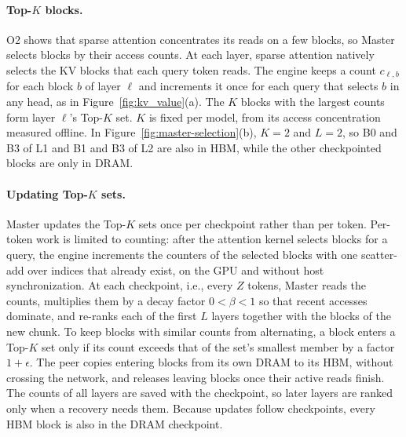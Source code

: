 \paragraph{Top-$K$ blocks.}
O2 shows that sparse attention concentrates its reads on a few blocks, so
Master selects blocks by their access counts. At each layer, sparse
attention natively selects the KV blocks that each query token reads. The
engine keeps a count $c_{\ell,b}$ for each block $b$ of layer $\ell$ and
increments it once for each query that selects $b$ in any head, as in
Figure~\ref{fig:kv_value}(a). The $K$ blocks with the largest counts form
layer $\ell$'s Top-$K$ set. $K$ is fixed per model, from its access
concentration measured offline. In Figure~\ref{fig:master-selection}(b),
$K=2$ and $L=2$, so B0 and B3 of L1 and B1 and B3 of L2 are also in HBM,
while the other checkpointed blocks are only in DRAM.

\paragraph{Updating Top-$K$ sets.}
Master updates the Top-$K$ sets once per checkpoint rather than per
token. Per-token work is limited to counting: after the attention kernel
selects blocks for a query, the engine increments the counters of the
selected blocks with one scatter-add over indices that already exist, on
the GPU and without host synchronization. At each checkpoint, i.e., every
$Z$ tokens, Master reads the counts, multiplies them by a decay factor
$0<\beta<1$ so that recent accesses dominate, and re-ranks each of the
first $L$ layers together with the blocks of the new chunk. To keep blocks
with similar counts from alternating, a block enters a Top-$K$ set only if
its count exceeds that of the set's smallest member by a factor $1+\epsilon$.
The peer copies entering blocks from its own DRAM to its HBM, without
crossing the network, and releases leaving blocks once their active reads
finish. The counts of all layers are saved with the checkpoint, so later
layers are ranked only when a recovery needs them. Because updates follow
checkpoints, every HBM block is also in the DRAM checkpoint.

